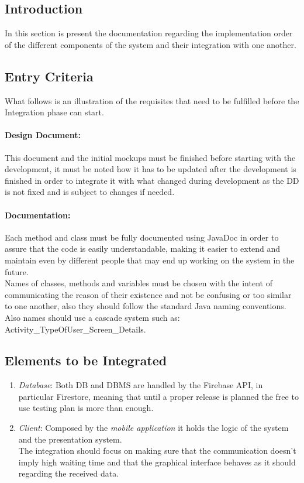 \subsection{Introduction}
In this section is present the documentation regarding the implementation order of the different components of the system and their integration with one another.
\subsection{Entry Criteria}
What follows is an illustration of the requisites that need to be fulfilled before the Integration phase can start.
\paragraph*{Design Document:\\} This document and the initial mockups must be finished before starting with the development, it must be noted how it has to be updated after the development is finished in order to integrate it with what changed during development as the DD is not fixed and is subject to changes if needed.
\paragraph*{Documentation:\\} Each method and class must be fully documented using JavaDoc in order to assure that the code is easily understandable, making it easier to extend and maintain even by different people that may end up working on the system in the future.\\
Names of classes, methods and variables must be chosen with the intent of communicating the reason of their existence and not be confusing or too similar to one another, also they should follow the standard Java naming conventions.\\
Also names should use a cascade system such as: Activity\_TypeOfUser\_Screen\_Details.
\subsection{Elements to be Integrated}
\begin{enumerate}
\item \emph{Database}: Both DB and DBMS are handled by the Firebase API, in particular Firestore, meaning that until a proper release is planned the free to use testing plan is more than enough.\\
\item \emph{Client}: Composed by the \emph{mobile application} it holds the logic of the system and the presentation system.\\
The integration should focus on making sure that the communication doesn't imply high waiting time and that the graphical interface behaves as it should regarding the received data.
\end{enumerate}